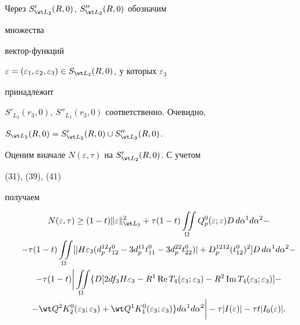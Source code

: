 \begin{pf} Через $S'_{\wt L_2}(R,0)$, $S''_{\wt L_2}(R,0)$ обозначим 


множества 


вектор-функций 


$\varepsilon=(\varepsilon_1,\varepsilon_2,\varepsilon_3)\in 


S_{\wt L_2}(R,0)$, у которых $\varepsilon_3$ 


принадлежит 


$S'_{L_2}(r_3,0)$, $S''_{L_2}(r_3,0)$ соответственно. Очевидно, 


$S_{\wt L_2}(R,0)=S'_{\wt L_2}(R,0)\cup S''_{\wt L_2}(R,0)$. 


 


Оценим вначале $N(\varepsilon,\tau)$ на $S'_{\wt L_2}(R,0)$. С учетом 


(31), (39), (41) 


получаем 


\begin{multline} 


N(\varepsilon,\tau)\ge (1-t)\|\varepsilon\|^2_{\wt L_2}+ 


\tau(1-t)\iint\limits_\Omega Q^0_p(\varepsilon;\varepsilon) 


D\,d\alpha^1d\alpha^2- \\ 


% 


-\tau(1-t)\iint\limits_\Omega[|H\varepsilon_3(d^{12}_p t^0_{12}- 


3d^{11}_p t^0_{11}-3d^{22}_p t^0_{22})|+ 


D^{1212}_p(t^0_{12})^2]D\,d\alpha^1d\alpha^2 - \\ 


% 


-\tau(1-t)\bigg|\iint\limits_\Omega\{D[2df_3 H\varepsilon_3- 


R^1\re T_4(\varepsilon_3;\varepsilon_3)-R^2\im T_4 


(\varepsilon_3;\varepsilon_3)]- \\ 


% 


-\wt Q^2K^0_2(\varepsilon_3;\varepsilon_3)+\wt Q^1K^0_1 


(\varepsilon_3;\varepsilon_3)\}d\alpha^1d\alpha^2\bigg| 


-\tau|I(\varepsilon)|-\tau t|I_0(\varepsilon)|. 


\end{multline} 



\end{pf}
